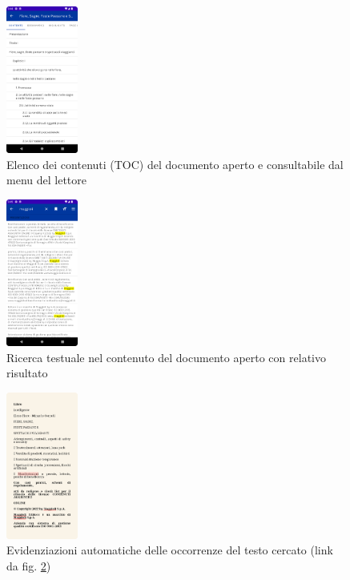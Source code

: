 \begin{multicols}{3}
            \begin{figure}[H]
                \includegraphics[width=0.21\textwidth]{img/toc.png}
                \caption{Elenco dei contenuti (TOC) del documento aperto e consultabile dal menu del lettore}
                \label{toc}
            \end{figure}
            
            \begin{figure}[H]
                \includegraphics[width=0.21\textwidth]{img/ricerca_testo.png}
                \caption{Ricerca testuale nel contenuto del documento aperto con relativo risultato}
                \label{ricerca_testo}
            \end{figure}
            
            \begin{figure}[H]
                \includegraphics[width=0.21\textwidth]{img/ricerca_testo2.png}
                \caption{Evidenziazioni automatiche delle occorrenze del testo cercato (link da fig. \ref{ricerca_testo})}
                \label{ricerca_testo2}
            \end{figure}
\end{multicols}

